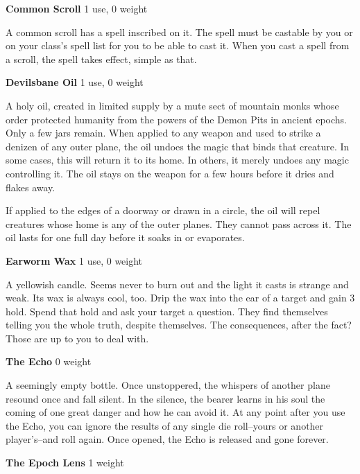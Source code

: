{\noindent \bfseries Common Scroll} \hspace*{\fill} 1 use, 0 weight

A common scroll has a spell inscribed on it. The spell must be castable by you or on your class's spell list for you to be able to cast it. When you cast a spell from a scroll, the spell takes effect, simple as that.

{\noindent \bfseries Devilsbane Oil} \hspace*{\fill} 1 use, 0 weight

A holy oil, created in limited supply by a mute sect of mountain monks whose order protected humanity from the powers of the Demon Pits in ancient epochs. Only a few jars remain. When applied to any weapon and used to strike a denizen of any outer plane, the oil undoes the magic that binds that creature. In some cases, this will return it to its home. In others, it merely undoes any magic controlling it. The oil stays on the weapon for a few hours before it dries and flakes away.

If applied to the edges of a doorway or drawn in a circle, the oil will repel creatures whose home is any of the outer planes. They cannot pass across it. The oil lasts for one full day before it soaks in or evaporates.

{\noindent \bfseries Earworm Wax} \hspace*{\fill} 1 use, 0 weight

A yellowish candle. Seems never to burn out and the light it casts is strange and weak. Its wax is always cool, too. Drip the wax into the ear of a target and gain 3 hold. Spend that hold and ask your target a question. They find themselves telling you the whole truth, despite themselves. The consequences, after the fact? Those are up to you to deal with.

{\noindent \bfseries The Echo} \hspace*{\fill} 0 weight

A seemingly empty bottle. Once unstoppered, the whispers of another plane resound once and fall silent. In the silence, the bearer learns in his soul the coming of one great danger and how he can avoid it. At any point after you use the Echo, you can ignore the results of any single die roll--yours or another player's--and roll again. Once opened, the Echo is released and gone forever.

{\noindent \bfseries The Epoch Lens} \hspace*{\fill} 1 weight

